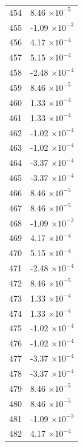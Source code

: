 \documentclass[a4paper,11pt]{article}
\begin{document}
\begin{center}
\begin{longtable}{|R{1.5cm}|R{2.5cm}|}
  454 &         8.46 $\times 10^{          -5}$ \\
  455 &        -1.09 $\times 10^{          -3}$ \\
  456 &         4.17 $\times 10^{          -4}$ \\
  457 &         5.15 $\times 10^{          -4}$ \\
  458 &        -2.48 $\times 10^{          -4}$ \\
  459 &         8.46 $\times 10^{          -5}$ \\
  460 &         1.33 $\times 10^{          -4}$ \\
  461 &         1.33 $\times 10^{          -4}$ \\
  462 &        -1.02 $\times 10^{          -4}$ \\
  463 &        -1.02 $\times 10^{          -4}$ \\
  464 &        -3.37 $\times 10^{          -4}$ \\
  465 &        -3.37 $\times 10^{          -4}$ \\
  466 &         8.46 $\times 10^{          -5}$ \\
  467 &         8.46 $\times 10^{          -5}$ \\
  468 &        -1.09 $\times 10^{          -3}$ \\
  469 &         4.17 $\times 10^{          -4}$ \\
  470 &         5.15 $\times 10^{          -4}$ \\
  471 &        -2.48 $\times 10^{          -4}$ \\
  472 &         8.46 $\times 10^{          -5}$ \\
  473 &         1.33 $\times 10^{          -4}$ \\
  474 &         1.33 $\times 10^{          -4}$ \\
  475 &        -1.02 $\times 10^{          -4}$ \\
  476 &        -1.02 $\times 10^{          -4}$ \\
  477 &        -3.37 $\times 10^{          -4}$ \\
  478 &        -3.37 $\times 10^{          -4}$ \\
  479 &         8.46 $\times 10^{          -5}$ \\
  480 &         8.46 $\times 10^{          -5}$ \\
  481 &        -1.09 $\times 10^{          -3}$ \\
  482 &         4.17 $\times 10^{          -4}$ \\

\end{longtable}
\end{center}
\end{document}
